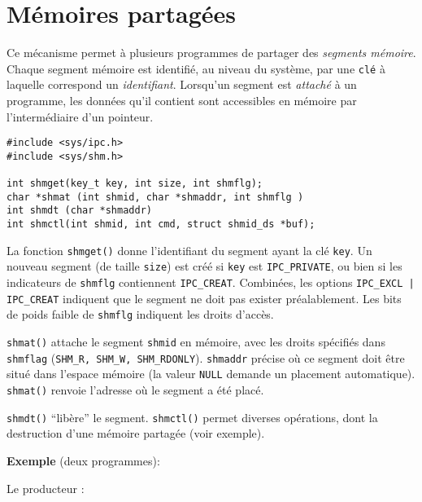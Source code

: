 \section{Mémoires partagées}

Ce mécanisme permet à plusieurs programmes de partager des \emph{segments
mémoire}. Chaque segment mémoire est identifié, au niveau du système,
par une \texttt{clé} à laquelle correspond un \emph{identifiant}. Lorsqu'un
segment est \emph{attaché} à un programme, les données qu'il contient
sont accessibles en mémoire par l'intermédiaire d'un pointeur.



\extrait
\begin{lstlisting}
#include <sys/ipc.h>
#include <sys/shm.h>

int shmget(key_t key, int size, int shmflg);
char *shmat (int shmid, char *shmaddr, int shmflg )
int shmdt (char *shmaddr)
int shmctl(int shmid, int cmd, struct shmid_ds *buf);
\end{lstlisting}



La fonction \texttt{shmget()} donne l'identifiant du segment ayant la
clé \texttt{key}. Un nouveau segment (de taille \texttt{size}) est
créé si \texttt{key} est \texttt{IPC\_PRIVATE}, ou bien si les
indicateurs de \texttt{shmflg} contiennent \texttt{IPC\_CREAT}.
Combinées, les options \texttt{IPC\_EXCL | IPC\_CREAT} indiquent que
le segment ne doit pas exister préalablement.  Les bits de poids
faible de \texttt{shmflg} indiquent les droits d'accès.




\texttt{shmat()} attache le segment \texttt{shmid} en mémoire, avec les droits
spécifiés dans \texttt{shmflag} (\texttt{SHM\_R, SHM\_W, SHM\_RDONLY}). 
\texttt{shmaddr}
précise où ce segment doit être situé dans l'espace mémoire
(la valeur \texttt{NULL} demande un placement automatique). 
\texttt{shmat()} renvoie
l'adresse où le segment a été placé.


\texttt{shmdt()} ``libère'' le segment. \texttt{shmctl()} permet diverses 
opérations, dont la destruction d'une mémoire partagée (voir exemple).

\textbf{Exemple} (deux programmes):

Le producteur :

\source



